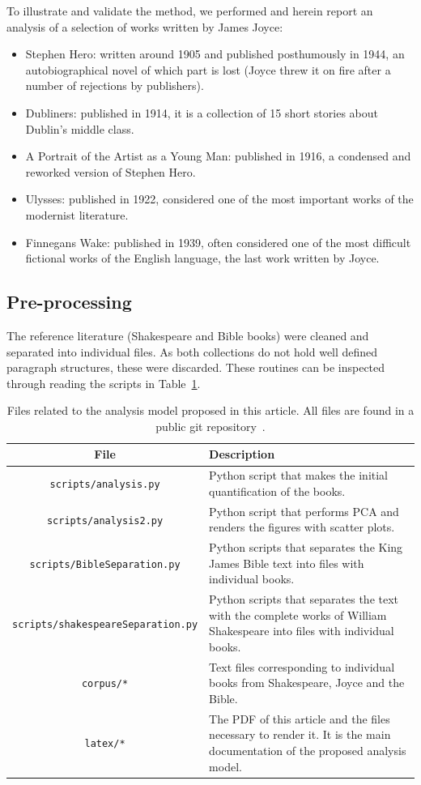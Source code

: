 \documentclass[12pt,fleqn]{article}
\begin{document}
To illustrate and validate the method,
we performed and herein report an analysis of a selection of works written by James Joyce:
\begin{itemize}
    \item Stephen Hero: written around 1905 and published posthumously in 1944, an autobiographical novel of which part is lost
        (Joyce threw it on fire after a number of rejections by publishers).
    \item Dubliners: published in 1914, it is a collection of 15 short stories about Dublin's middle class.
    \item A Portrait of the Artist as a Young Man: published in 1916, a condensed and reworked version of Stephen Hero. 
    \item Ulysses: published in 1922, considered one of the most important works of the modernist literature.
    \item Finnegans Wake: published in 1939, often considered one of the most difficult fictional works of the English language,
        the last work written by Joyce.
\end{itemize}

\subsection{Pre-processing}
The reference literature (Shakespeare and Bible books) were cleaned and separated into
individual files.
As both collections do not hold well defined paragraph structures,
these were discarded.
These routines can be inspected through reading the scripts in Table~\ref{tab:files}.

\begin{table}[H] %
	\caption{Files related to the analysis model proposed in this article.
	All files are found in a public git repository~\citep{repo}.}\label{tab:files}
\vspace{12pt}
\centering{}
	\begin{tabular}{  c | p{7cm} }
	\textbf{File}           & \textbf{Description} \\\hline
	\texttt{scripts/analysis.py}  & Python script that makes the initial quantification of the books. \\
	\texttt{scripts/analysis2.py}  & Python script that performs PCA and renders the figures with scatter plots. \\
	\texttt{scripts/BibleSeparation.py}  & Python scripts that separates the King James Bible text into files with individual books. \\
	\texttt{scripts/shakespeareSeparation.py}  & Python scripts that separates the text with the complete works of William Shakespeare into files with individual books. \\
        \texttt{corpus/*}  & Text files corresponding to individual books from Shakespeare, Joyce and the Bible.  \\
	\texttt{latex/*}  & The PDF of this article and the files necessary to render it. It is the main documentation of the proposed analysis model. \\
\end{tabular}
\end{table}
\end{document}
